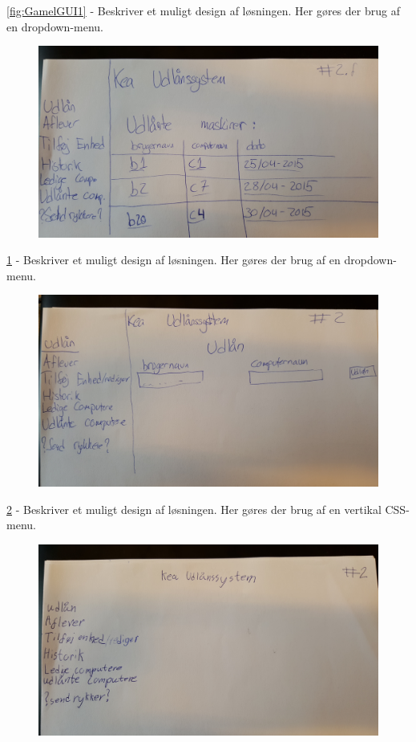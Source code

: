 \documentclass[a4paper]{article}
\begin{document}
\ref{fig:GamelGUI1} - Beskriver et muligt design af løsningen. Her gøres der brug
af en dropdown-menu.\\[0.1in]
\begin{figure}[h!]
\centering
\includegraphics[width=1\textwidth]{2min.jpg}
\caption{}
\label{fig:GamelGUI2}
\end{figure}
\ref{fig:GamelGUI2} - Beskriver et muligt design af løsningen. Her gøres der brug
af en dropdown-menu.\\[0.1in]
\begin{figure}[h!]
\centering
\includegraphics[width=1\textwidth]{3min.jpg}
\caption{}
\label{fig:GamelGUI3}
\end{figure}
\ref{fig:GamelGUI3} - Beskriver et muligt design af løsningen. Her gøres der brug
af en vertikal CSS-menu.\\[0.1in]
\begin{figure}[h!]
\centering
\includegraphics[width=1\textwidth]{4min.jpg}
\caption{}
\label{fig:GamelGUI4}
\end{figure}
\end{document}
